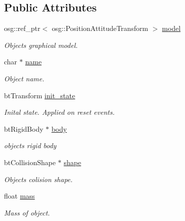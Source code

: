 \subsection*{Public Attributes}
\begin{DoxyCompactItemize}
\item 
\mbox{\label{classbtosgObject_afd15726e7a214212d6d5815f8ac1ac6c}} 
osg\+::ref\+\_\+ptr$<$ osg\+::\+Position\+Attitude\+Transform $>$ \hyperlink{classbtosgObject_afd15726e7a214212d6d5815f8ac1ac6c}{model}
\begin{DoxyCompactList}\small\item\em Object\textquotesingle{}s graphical model. \end{DoxyCompactList}\item 
\mbox{\label{classbtosgObject_a12396e1362797a75473a2e833b579cc9}} 
char $\ast$ \hyperlink{classbtosgObject_a12396e1362797a75473a2e833b579cc9}{name}
\begin{DoxyCompactList}\small\item\em Object name. \end{DoxyCompactList}\item 
\mbox{\label{classbtosgObject_a2dee023f311114e200df9b04c8c1b400}} 
bt\+Transform \hyperlink{classbtosgObject_a2dee023f311114e200df9b04c8c1b400}{init\+\_\+state}
\begin{DoxyCompactList}\small\item\em Inital state. Applied on reset events. \end{DoxyCompactList}\item 
\mbox{\label{classbtosgObject_a64ccde0543c184ed1749fdb9c9699785}} 
bt\+Rigid\+Body $\ast$ \hyperlink{classbtosgObject_a64ccde0543c184ed1749fdb9c9699785}{body}
\begin{DoxyCompactList}\small\item\em object\textquotesingle{}s rigid body \end{DoxyCompactList}\item 
\mbox{\label{classbtosgObject_a0f6a8da01cf643c321bffe86e42604b0}} 
bt\+Collision\+Shape $\ast$ \hyperlink{classbtosgObject_a0f6a8da01cf643c321bffe86e42604b0}{shape}
\begin{DoxyCompactList}\small\item\em Object\textquotesingle{}s colision shape. \end{DoxyCompactList}\item 
\mbox{\label{classbtosgObject_a2418bb2194d5e9b0f1c51c84672ba7d1}} 
float \hyperlink{classbtosgObject_a2418bb2194d5e9b0f1c51c84672ba7d1}{mass}
\begin{DoxyCompactList}\small\item\em Mass of object. \end{DoxyCompactList}\end{DoxyCompactItemize}


